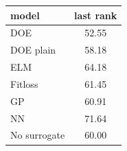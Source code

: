 \begin{tabular}{|lc|}
\hline
model & last rank\\
\hline
DOE & 52.55 \\
DOE plain & 58.18 \\
ELM & 64.18 \\
Fitloss & 61.45 \\
GP & 60.91 \\
NN & 71.64 \\
No surrogate & 60.00 \\
\hline
\end{tabular}
